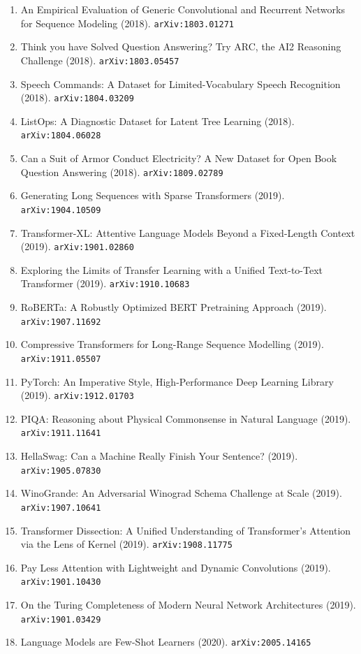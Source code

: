 \documentclass[11pt]{article}
\begin{document}
\begin{enumerate}
  \item An Empirical Evaluation of Generic Convolutional and Recurrent Networks
  for Sequence Modeling (2018). \texttt{arXiv:1803.01271}
  \item Think you have Solved Question Answering? Try ARC, the AI2 Reasoning
  Challenge (2018). \texttt{arXiv:1803.05457}
  \item Speech Commands: A Dataset for Limited-Vocabulary Speech Recognition (2018). \texttt{arXiv:1804.03209}
  \item ListOps: A Diagnostic Dataset for Latent Tree Learning (2018). \texttt{arXiv:1804.06028}
  \item Can a Suit of Armor Conduct Electricity? A New Dataset for Open Book
  Question Answering (2018). \texttt{arXiv:1809.02789}
  \item Generating Long Sequences with Sparse Transformers (2019). \texttt{arXiv:1904.10509}
  \item Transformer-XL: Attentive Language Models Beyond a Fixed-Length Context (2019). \texttt{arXiv:1901.02860}
  \item Exploring the Limits of Transfer Learning with a Unified Text-to-Text
  Transformer (2019). \texttt{arXiv:1910.10683}
  \item RoBERTa: A Robustly Optimized BERT Pretraining Approach (2019). \texttt{arXiv:1907.11692}
  \item Compressive Transformers for Long-Range Sequence Modelling (2019). \texttt{arXiv:1911.05507}
  \item PyTorch: An Imperative Style, High-Performance Deep Learning Library (2019). \texttt{arXiv:1912.01703}
  \item PIQA: Reasoning about Physical Commonsense in Natural Language (2019). \texttt{arXiv:1911.11641}
  \item HellaSwag: Can a Machine Really Finish Your Sentence? (2019). \texttt{arXiv:1905.07830}
  \item WinoGrande: An Adversarial Winograd Schema Challenge at Scale (2019). \texttt{arXiv:1907.10641}
  \item Transformer Dissection: A Unified Understanding of Transformer's
  Attention via the Lens of Kernel (2019). \texttt{arXiv:1908.11775}
  \item Pay Less Attention with Lightweight and Dynamic Convolutions (2019). \texttt{arXiv:1901.10430}
  \item On the Turing Completeness of Modern Neural Network Architectures (2019). \texttt{arXiv:1901.03429}
  \item Language Models are Few-Shot Learners (2020). \texttt{arXiv:2005.14165}

\end{enumerate}
\end{document}
